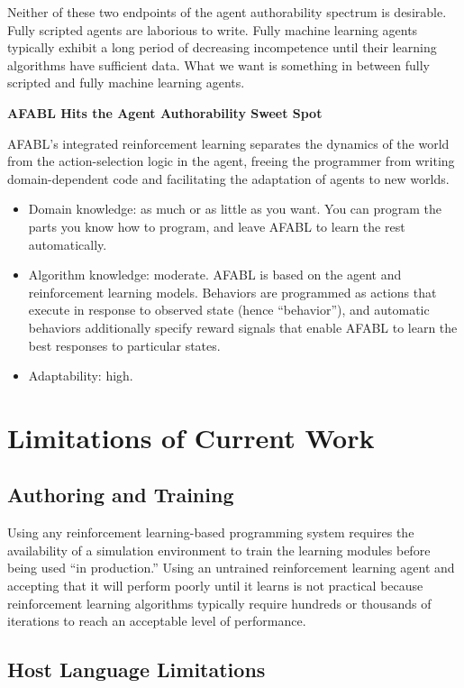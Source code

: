 Neither of these two endpoints of the agent authorability spectrum is desirable.  Fully scripted agents are laborious to write.  Fully machine learning agents typically exhibit a long period of decreasing incompetence until their learning algorithms have sufficient data.  What we want is something in between fully scripted and fully machine learning agents.


{\bf AFABL Hits the Agent Authorability Sweet Spot}

AFABL's integrated reinforcement learning separates the dynamics of the world from the action-selection logic in the agent, freeing the programmer from writing domain-dependent code and facilitating the adaptation of agents to new worlds.

\begin{itemize}
\item Domain knowledge: as much or as little as you want.  You can program the parts you know how to program, and leave AFABL to learn the rest automatically.
\item Algorithm knowledge: moderate.  AFABL is based on the agent and reinforcement learning models.  Behaviors are programmed as actions that execute in response to observed state (hence ``behavior''), and automatic behaviors additionally specify reward signals that enable AFABL to learn the best responses to particular states.
\item Adaptability: high.
\end{itemize}


\section{Limitations of Current Work}

\subsection{Authoring and Training}

Using any reinforcement learning-based programming system requires the availability of a simulation environment to train the learning modules before being used ``in production.'' Using an untrained reinforcement learning agent and accepting that it will perform poorly until it learns is not practical because reinforcement learning algorithms typically require hundreds or thousands of iterations to reach an acceptable level of performance.

\subsection{Host Language Limitations}

